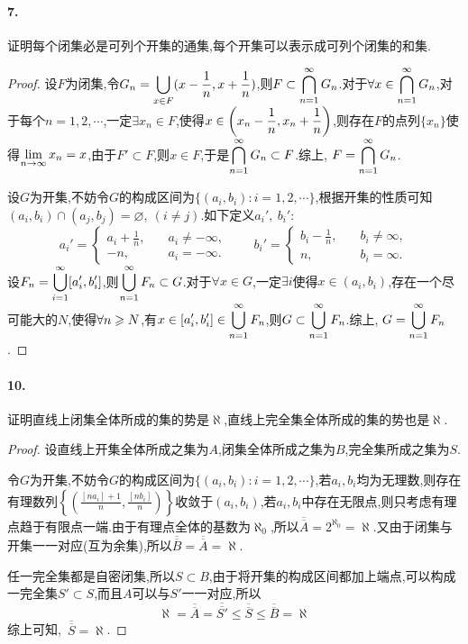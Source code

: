 \documentclass[12pt, a4paper, oneside]{ctexart}
\begin{document}
\paragraph{7.}证明每个闭集必是可列个开集的通集,每个开集可以表示成可列个闭集的和集.
\begin{proof}
    设$F$为闭集,令$\displaystyle G_n = \bigcup_{x\in F}(x-\frac{1}{n}, x+\frac{1}{n})$,则$\displaystyle F\subset \bigcap_{n=1}^{\infty}G_n$.对于$\displaystyle \forall x\in\bigcap_{n=1}^{\infty}G_n$,对于每个$n = 1,2,\cdots$,一定$\exists x_n\in F$,使得$\displaystyle x\in \left(x_n-\frac{1}{n}, x_n + \frac{1}{n}\right)$,则存在$F$的点列$\{x_n\}$使得$\displaystyle\lim_{n\rightarrow \infty}x_n = x$,由于$F'\subset F$,则$x\in F$,于是$\displaystyle \bigcap_{n=1}^{\infty}G_n\subset F$.综上,$\ \displaystyle F=\bigcap_{n=1}^{\infty}G_n$.

    设$G$为开集,不妨令$G$的构成区间为$\{(a_i,b_i):i=1,2,\cdots\}$,根据开集的性质可知$(a_i,b_i)\cap(a_j,b_j) = \varnothing,\ (i\neq j)$.如下定义$a_i',\ b_i'$:
    \begin{equation*}
        a_i' = 
        \begin{cases}
            a_i+\frac{1}{n},&\quad a_i\neq -\infty,\\
            -n,&\quad a_i = -\infty.
        \end{cases}\qquad
        b_i' = 
        \begin{cases}
            b_i-\frac{1}{n},&\quad b_i\neq \infty,\\
            n,&\quad b_i=\infty.
        \end{cases}
    \end{equation*}
    设$\displaystyle F_n = \bigcup_{i=1}^{\infty}[a_i', b_i']$,则$\displaystyle \bigcup_{n=1}^{\infty}F_n\subset G$.对于$\forall x\in G$,一定$\exists i$使得$x\in(a_i,b_i)$,存在一个尽可能大的$N$,使得$\displaystyle \forall n\geqslant N$,有$\displaystyle x\in[a_i',b_i']\in \bigcup_{n=1}^{\infty}F_n$,则$\displaystyle G\subset \bigcup_{n=1}^{\infty}F_n$.综上,$\ \displaystyle G= \bigcup_{n=1}^{\infty}F_n$.
\end{proof}
\paragraph{10.}证明直线上闭集全体所成的集的势是$\aleph$,直线上完全集全体所成的集的势也是$\aleph$.
\def\o{\overline}
\begin{proof}
    设直线上开集全体所成之集为$A$,闭集全体所成之集为$B$,完全集所成之集为$S$.
    
    令$G$为开集,不妨令$G$的构成区间为$\{(a_i,b_i):i=1,2,\cdots\}$,若$a_i,b_i$均为无理数,则存在有理数列$\left\{\left(\frac{[na_i]+1}{n},\frac{[nb_i]}{n}\right)\right\}$收敛于$(a_i,b_i)$,若$a_i,b_i$中存在无限点,则只考虑有理点趋于有限点一端.由于有理点全体的基数为$\aleph_0$,所以$\o{\o{A}} = 2^{\aleph_0} = \aleph$.又由于闭集与开集一一对应(互为余集),所以$\o{\o{B}} = \o{\o{A}} = \aleph$.

    任一完全集都是自密闭集,所以$S\subset B$,由于将开集的构成区间都加上端点,可以构成一完全集$S'\subset S$,而且$A$可以与$S'$一一对应,所以\begin{equation*}
        \aleph = \o{\o{A}} = \o{\o{S'}} \leqslant  \o{\o{S}}\leqslant \o{\o{B}} = \aleph
    \end{equation*}
    综上可知,\ $ \o{\o{S}} = \aleph$.
\end{proof}
\end{document}

